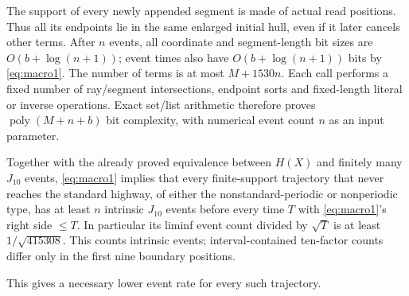 The support of every newly appended segment is made of actual read
positions. Thus all its endpoints lie in the same enlarged initial hull,
even if it later cancels other terms. After $n$ events, all coordinate and
segment-length bit sizes are $O(b+\log(n+1))$; event times also have
$O(b+\log(n+1))$ bits by \eqref{eq:macro1}. The number of terms is at most $M+1530n$.
Each call performs a fixed number of ray/segment intersections, endpoint
sorts and fixed-length literal or inverse operations. Exact set/list
arithmetic therefore proves $\operatorname{poly}(M+n+b)$ bit complexity, with numerical event
count $n$ as an input parameter.

Together with the already proved equivalence between $H(X)$ and finitely many $J_{10}$ events,
\eqref{eq:macro1} implies that every finite-support trajectory that never reaches the standard highway, of either the nonstandard-periodic or nonperiodic type,
has at least $n$ intrinsic $J_{10}$ events before every time $T$ with \eqref{eq:macro1}'s
right side $\le T$. In particular its liminf event count divided by
$\sqrt T$ is at least $1/\sqrt{415308}$. This counts intrinsic events;
interval-contained ten-factor counts differ only in the first nine
boundary positions.

This gives a necessary lower event rate for every such trajectory.
